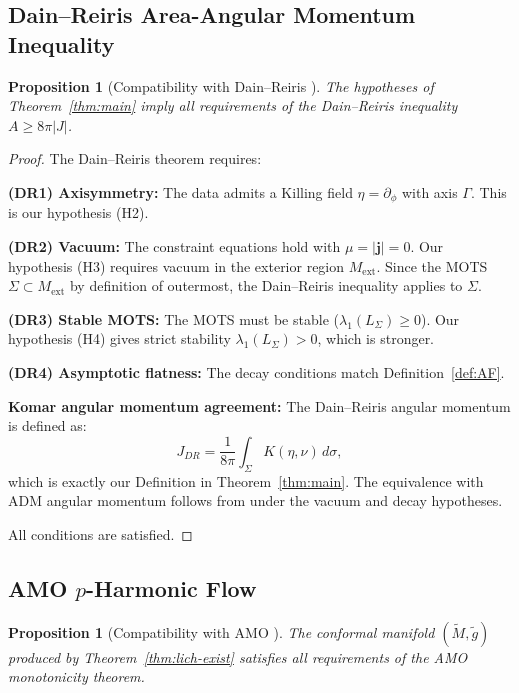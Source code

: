 \documentclass[12pt]{article}
\theoremstyle{plain}
\newtheorem{proposition}[theorem]{Proposition}
\theoremstyle{definition}
\theoremstyle{remark}
\newcommand{\tM}{\tilde{M}}
\newcommand{\tg}{\tilde{g}}
\newcommand{\momdens}{\boldsymbol{j}}
\begin{document}
\subsection{Dain--Reiris Area-Angular Momentum Inequality}

\begin{proposition}[Compatibility with Dain--Reiris {\cite[Theorem~1]{dain2011}}]\label{prop:dainreiris-compat}
The hypotheses of Theorem~\ref{thm:main} imply all requirements of the Dain--Reiris inequality $A \geq 8\pi|J|$.
\end{proposition}

\begin{proof}
The Dain--Reiris theorem requires:

\textbf{(DR1) Axisymmetry:} The data admits a Killing field $\eta = \partial_\phi$ with axis $\Gamma$. This is our hypothesis (H2).

\textbf{(DR2) Vacuum:} The constraint equations hold with $\mu = |\momdens| = 0$. Our hypothesis (H3) requires vacuum in the exterior region $M_{\mathrm{ext}}$. Since the MOTS $\Sigma \subset M_{\mathrm{ext}}$ by definition of outermost, the Dain--Reiris inequality applies to $\Sigma$.

\textbf{(DR3) Stable MOTS:} The MOTS must be stable ($\lambda_1(L_\Sigma) \geq 0$). Our hypothesis (H4) gives strict stability $\lambda_1(L_\Sigma) > 0$, which is stronger.

\textbf{(DR4) Asymptotic flatness:} The decay conditions match Definition~\ref{def:AF}.

\textbf{Komar angular momentum agreement:} The Dain--Reiris angular momentum is defined as:
\[
J_{DR} = \frac{1}{8\pi}\int_\Sigma K(\eta, \nu)\,d\sigma,
\]
which is exactly our Definition in Theorem~\ref{thm:main}. The equivalence with ADM angular momentum follows from \cite[Proposition~2.3]{chrusciel2008} under the vacuum and decay hypotheses.

All conditions are satisfied. \qedhere
\end{proof}

\subsection{AMO \texorpdfstring{$p$}{p}-Harmonic Flow}

\begin{proposition}[Compatibility with AMO {\cite[Theorem~1.1]{amo2022}}]\label{prop:amo-compat}
The conformal manifold $(\tM, \tg)$ produced by Theorem~\ref{thm:lich-exist} satisfies all requirements of the AMO monotonicity theorem.
\end{proposition}
\end{document}

